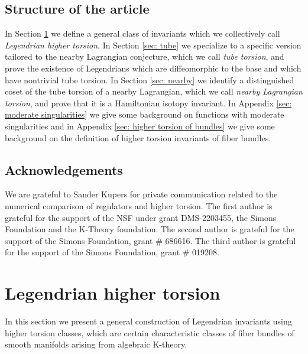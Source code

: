 \documentclass{amsart}
\theoremstyle{definition}
\theoremstyle{remark}
\newtheorem{inductive lemma}[theorem]{Inductive Lemma}
\begin{document}
\subsection{Structure of the article}\label{sec: structure}
In Section \ref{sec: Reidemeister} we define a general class of invariants which we collectively call {\em Legendrian higher torsion}. In Section \ref{sec: tube} we specialize to a specific version tailored to the nearby Lagrangian conjecture, which we call {\em tube torsion}, and prove the existence of Legendrians which are diffeomorphic to the base and which have nontrivial tube torsion. In Section \ref{sec: nearby} we identify a distinguished coset of the tube torsion of a nearby Lagrangian, which we call {\em nearby Lagrangian torsion}, and prove that it is a Hamiltonian isotopy invariant. %
In Appendix \ref{sec: moderate singularities} we give some background on functions with moderate singularities and in  Appendix \ref{sec: higher torsion of bundles} we give some background on the definition of higher torsion invariants of fiber bundles.

\subsection{Acknowledgements}
We are grateful to Sander Kupers for private communication related to the numerical comparison of regulators and higher torsion. The first author is grateful for the support of the NSF under grant DMS-2203455, the Simons Foundation and the K-Theory foundation.  The second author is grateful for the support of the Simons Foundation, grant \# 686616. The third author is grateful for the support of the Simons Foundation, grant \# 019208.


\section{Legendrian higher torsion}\label{sec: Reidemeister}

In this section we present a general construction of Legendrian invariants using higher torsion classes, which are certain characteristic classes of fiber bundles of smooth manifolds arising from algebraic K-theory. %
\end{document}
